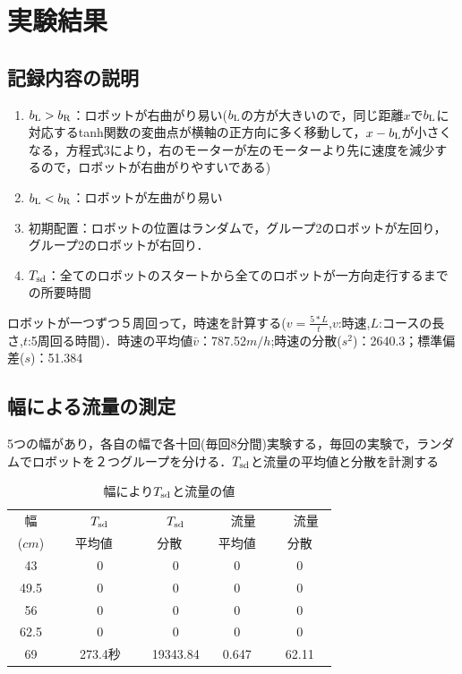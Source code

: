 \documentclass[twocolumn]{jarticle} %
\begin{document}
\section{実験結果}
\subsection{記録内容の説明}

\begin{enumerate}
\item $b_{\rm L}>b_{\rm R}$：ロボットが右曲がり易い($b_{\rm L}$の方が大きいので，同じ距離$x$で$b_{\rm L}$に対応するtanh関数の変曲点が横軸の正方向に多く移動して，$x-b_{\rm L}$が小さくなる，方程式3により，右のモーターが左のモーターより先に速度を減少するので，ロボットが右曲がりやすいである)
\item $b_{\rm L}<b_{\rm R}$：ロボットが左曲がり易い
\item 初期配置：ロボットの位置はランダムで，グループ2のロボットが左回り，グループ2のロボットが右回り．
\item $T_{\rm sd}$：全てのロボットのスタートから全てのロボットが一方向走行するまでの所要時間
\end{enumerate}


ロボットが一つずつ５周回って，時速を計算する($v=\frac{5*L}{t}$,$v$:時速,$L$:コースの長さ,$t$:5周回る時間)．時速の平均値$\bar v$：787.52$m/h$;時速の分散($s^2$)：2640.3；標準偏差($s$)：51.384


\subsection{幅による流量の測定}
5つの幅があり，各自の幅で各十回(毎回8分間)実験する，毎回の実験で，ランダムでロボットを２つグループを分ける．$T_{\rm sd}$と流量の平均値と分散を計測する
\begin{table}[!ht]
\begin{center}
\begin{tabular}{|c|c|c|c|c|}
\hline
幅　&　$T_{\rm sd}$　&　$T_{\rm sd}$　&　流量　&　流量　\\
($cm$)   &   平均値 & 分散 & 平均値 & 分散 \\
\hline
43　&　0　&　0 & 0 & 0 \\
\hline
49.5　&　0　&　0 & 0 & 0 \\
\hline
56　&　0　&　0 & 0 & 0 \\
\hline
62.5　&　0　&　0 & 0 & 0 \\
\hline
69　&　273.4秒　&　19343.84 & 0.647 & 62.11 \\
\hline
\end{tabular}
\end{center}
\caption{
幅により$T_{\rm sd}$と流量の値
}
\end{table}
\end{document}
